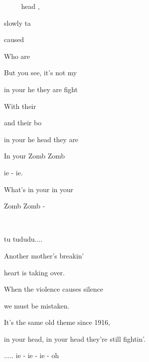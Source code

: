 


  ~  ~  ~ 
\zs 
{} head , 

 slowly ta
 
 caused 
 
Who are 
 
But you see,  it's not my  

in your he they are fight
\ks

\zr 
With their  

and their bo 

in your he head they are 
 
In your   Zomb Zomb 

ie - ie. 

What's in your  in your  

Zomb Zomb -  

 ~  ~  ~  ~  ~  ~ 

tu tududu.... 
\kr

\zs
Another mother's breakin' 

heart is taking over. 

When the violence causes silence 

we must be mistaken. 

It's the same old theme since 1916, 

in your head, in your head they're still fightin'. 
\ks

\zr
..... ie - ie - ie -  oh       
\kr 

\kp